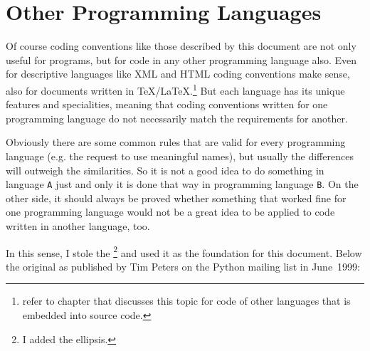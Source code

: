 \section{Other Programming Languages}\label{sec:OtherProgrammingLanguages}
Of course coding conventions like those described by this document are not only useful for \Java programs, but for code in any other programming language also. Even for descriptive languages like XML and HTML coding conventions make sense, also for documents written in \TeX/\LaTeX{}.\footnote{refer to chapter  that discusses this topic for code of other languages that is embedded into \Java source code.} But each language has its unique features and specialities, meaning that coding conventions written for one programming language do not necessarily match the requirements for another.

Obviously there are some common rules that are valid for every programming language (e.g. the request to use meaningful names), but usually the differences will outweigh the similarities. So it is not a good idea to do something in language \texttt{A} just and only it is done that way in programming language \texttt{B}. On the other side, it should always be proved whether something that worked fine for one programming language would not be a great idea to be applied to code written in another language, too.

In this sense, I stole the  \autocite{WIKIPEDIA:ZenOfPython,PYTHON_ORG_MAILING_LIST:ThePythonWay}\footnote{I added the ellipsis.} and used it as the foundation for this document. Below the original as published by Tim Peters on the Python mailing list in June~1999:

